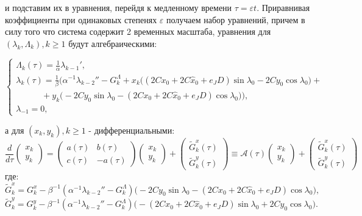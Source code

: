     и подставим их в уравнения, перейдя к медленному времени $\tau=\varepsilon t$.
    Приравнивая коэффициенты при одинаковых степенях $\varepsilon$ получаем набор уравнений, причем в силу того что система содержит 2 временных масштаба, уравнения для $(\lambda_k, \Lambda_k), k \ge 1$ будут алгебраическими:

\begin{equation}
    \begin{cases}
        \Lambda_k(\tau) = \frac{1}{\alpha} \lambda_{k-1}', \\
        
        \lambda_k(\tau) = \frac1\beta \Big( \alpha^{-1} \lambda_{k-2}'' - G_k^\Lambda + x_k \big( (2Cx_0+2C \hat x_0+e_JD) \sin\lambda_0 - 2Cy_0 \cos\lambda_0 \big) + \\
        
        \quad \quad \quad +y_k \big( -2Cy_0 \sin\lambda_0 - (2Cx_0+2C \hat x_0+e_JD) \cos\lambda_0 \big) \Big),\\
        \lambda_{-1}=0,
    \end{cases}
\end{equation}

а для $(x_k,y_k), k \ge 1$ - дифференциальными:
\begin{equation}
\frac{d}{d\tau} \begin{pmatrix} x_k \\ y_k \end{pmatrix} = \begin{pmatrix} a(\tau) & b(\tau)\\ c(\tau) & -a(\tau) \end{pmatrix} \begin{pmatrix} x_k \\ y_k \end{pmatrix} + \begin{pmatrix} \tilde G_k^x(\tau) \\ \tilde G_k^y(\tau) \end{pmatrix} \equiv \mathcal{A}(\tau) \begin{pmatrix} x_k \\ y_k \end{pmatrix} + \begin{pmatrix} \tilde G_k^x(\tau) \\ \tilde G_k^y(\tau) \end{pmatrix}
\label{xy_eq}
\end{equation}
где:
$$ \tilde G_k^x = G_k^x - \beta^{-1} (\alpha^{-1} \lambda_{k-2}'' - G_k^\Lambda) \big( -2Cy_0 \sin\lambda_0 - (2Cx_0+2C \hat x_0+e_JD) \cos\lambda_0 \big), $$
$$ \tilde G_k^y = G_k^y - \beta^{-1} (\alpha^{-1} \lambda_{k-2}'' - G_k^\Lambda) \big( -(2Cx_0+2C \hat x_0+e_JD) \sin\lambda_0 + 2Cy_0 \cos\lambda_0 \big). $$


